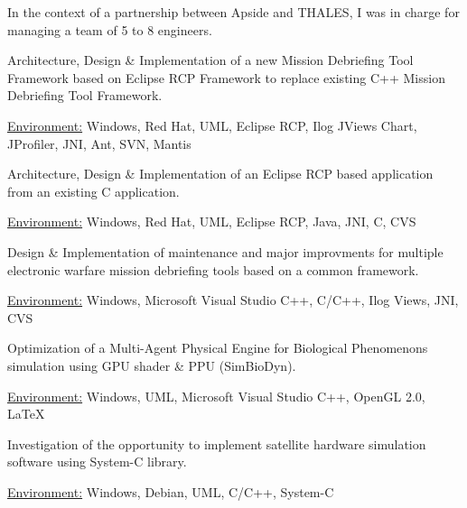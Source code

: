 \documentclass[10pt,letterpaper]{resume/resume}
\begin{document}
\begin{minipage}[t]{\linewidth}
\par In the context of a partnership between Apside and THALES, I was in charge for managing a team of 5 to 8 engineers.
\par Architecture, Design \& Implementation of a new Mission Debriefing Tool Framework based on Eclipse RCP Framework to replace existing C++ Mission Debriefing Tool Framework.
\par\underline{Environment:} Windows, Red Hat, UML, Eclipse RCP, Ilog JViews Chart, JProfiler, JNI, Ant, SVN, Mantis

\par Architecture, Design \& Implementation of an Eclipse RCP based application from an existing C application.
\par\underline{Environment:} Windows, Red Hat, UML, Eclipse RCP, Java, JNI, C, CVS

\par Design \& Implementation of maintenance and major improvments for multiple electronic warfare mission debriefing tools based on a common framework.
\par\underline{Environment:} Windows, Microsoft Visual Studio C++, C/C++, Ilog Views, JNI, CVS

\par Optimization of a Multi-Agent Physical Engine for Biological Phenomenons simulation using GPU shader \& PPU (SimBioDyn).
\par\underline{Environment:} Windows, UML, Microsoft Visual Studio C++, OpenGL 2.0, \LaTeX

\par Investigation of the opportunity to implement satellite hardware simulation software using System-C library.
\par\underline{Environment:} Windows, Debian, UML, C/C++, System-C
  \end{minipage}
\end{document}
